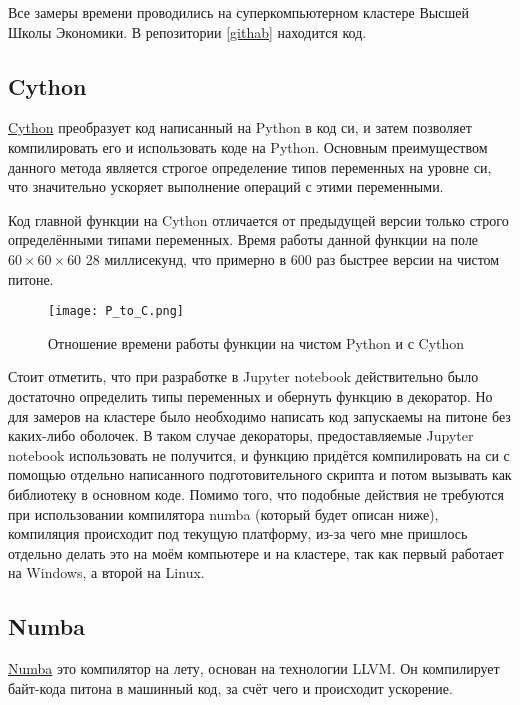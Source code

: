\documentclass[a4paper,12pt]{article}
\begin{document}
Все замеры времени проводились на суперкомпьютерном кластере Высшей Школы Экономики. В репозитории \ref{githab} находится код.

\subsection{Cython}

\href{https://cython.org/}{Cython} преобразует код написанный на Python в код си, и затем позволяет компилировать его и использовать коде на Python. Основным преимуществом данного метода является строгое определение типов переменных на уровне си, что значительно ускоряет выполнение операций с этими переменными. 


Код главной функции на Cython отличается от предыдущей версии только строго определёнными типами переменных. Время работы данной функции на поле $60\times60\times60$ 28 миллисекунд, что примерно в 600 раз быстрее версии на чистом питоне. 

\begin{figure}[H]
	 \centering
    	\texttt{[image: P\_to\_C.png]}
    	\caption{Отношение времени работы функции на чистом Python и с Cython}
	\label{fig:Fcgraph}
\end{figure}

Стоит отметить, что при разработке в Jupyter notebook действительно было достаточно определить типы переменных и обернуть функцию в декоратор. Но для замеров на кластере было необходимо написать код запускаемы на питоне без каких-либо оболочек. В таком случае декораторы, предоставляемые Jupyter notebook использовать не получится, и функцию придётся компилировать на си с помощью отдельно написанного подготовительного скрипта и потом вызывать как библиотеку в основном коде. Помимо того, что подобные действия не требуются при использовании компилятора numba (который будет описан ниже), компиляция происходит под текущую платформу, из-за чего мне пришлось отдельно делать это на моём компьютере и на кластере, так как первый работает на Windows, а второй на Linux.



\subsection{Numba}

\href{http://numba.pydata.org/}{Numba} это компилятор на лету, основан на технологии LLVM. Он компилирует байт-кода питона в машинный код, за счёт чего и происходит ускорение.
\end{document}
